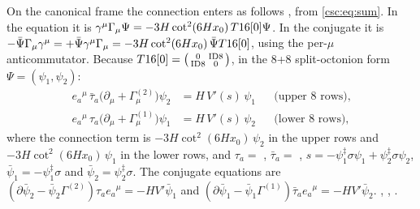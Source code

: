 On the canonical frame the connection enters as follows \cfderived, from \eqref{csc:eq:sum}. In
the equation it is $\gamma^\mu\Gamma_\mu\Psi=-3H\cot^2(6Hx_0)\,T16[0]\Psi$. In the conjugate it is
$-\bar\Psi\Gamma_\mu\gamma^\mu=+\bar\Psi\gamma^\mu\Gamma_\mu=-3H\cot^2(6Hx_0)\,\bar\Psi T16[0]$,
using the per-$\mu$ anticommutator. Because
$T16[0]=\bigl(\begin{smallmatrix}0&\mathrm{ID8}\\ \mathrm{ID8}&0\end{smallmatrix}\bigr)$, in the 8+8
split-octonion form $\Psi=(\psi_1,\psi_2)$:
\begin{align}
  e_a{}^\mu\,\bar\tau_a\bigl(\partial_\mu+\Gamma^{(2)}_\mu\bigr)\psi_2&=H\,V'(s)\,\psi_1
    &&\text{(upper 8 rows)},\\
  e_a{}^\mu\,\tau_a\bigl(\partial_\mu+\Gamma^{(1)}_\mu\bigr)\psi_1&=H\,V'(s)\,\psi_2
    &&\text{(lower 8 rows)},
\end{align}
where the connection term is $-3H\cot^2(6Hx_0)\,\psi_2$ in the upper rows and
$-3H\cot^2(6Hx_0)\,\psi_1$ in the lower rows, and $\tau_a=$ , $\bar\tau_a=$ ,
$s=-\psi_1^\ddagger\sigma\psi_1+\psi_2^\ddagger\sigma\psi_2$, $\bar\psi_1=-\psi_1^\ddagger\sigma$
and $\bar\psi_2=\psi_2^\ddagger\sigma$. The conjugate equations are
$(\partial\bar\psi_2-\bar\psi_2\Gamma^{(2)})\tau_a e_a{}^\mu=-HV'\bar\psi_1$ and
$(\partial\bar\psi_1-\bar\psi_1\Gamma^{(1)})\bar\tau_a e_a{}^\mu=-HV'\bar\psi_2$.
 , , .

